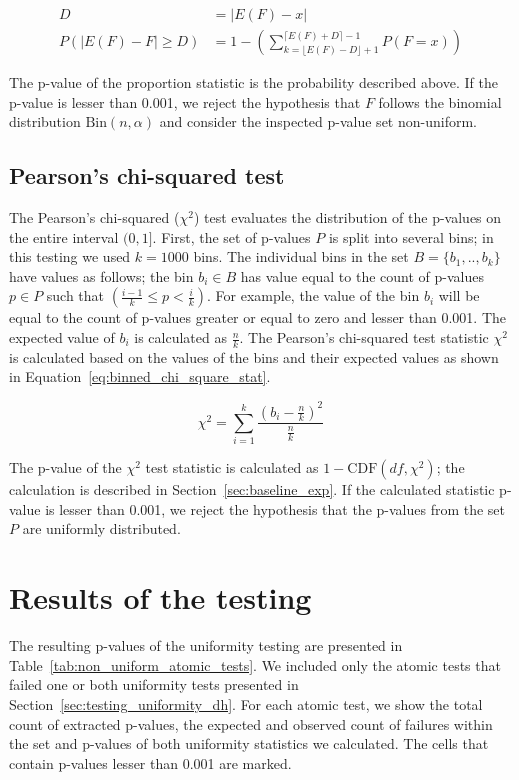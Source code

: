 \documentclass[
  digital,  	%
  color,		%
  oneside,   	%
  12pt,
  nocover,
  notable,
  nolof,
  nolot,
]{fithesis3}
\theoremstyle{definition}
\theoremstyle{remark}
\begin{document}
\begin{align}
D &= \lvert E(F) - x \rvert \\
\label{eq:prop_statistic}
P(\lvert E(F) - F \rvert \geq D) &= 1 - \left( \sum\limits_{k=\lfloor E(F)-D \rfloor + 1}^{\lceil E(F)+D \rceil - 1} P(F = x) \right)
\end{align}

The p-value of the proportion statistic is the probability described above. If the p-value is lesser than 0.001, we reject the hypothesis that $F$ follows the binomial distribution $\text{Bin}(n,\alpha)$ and consider the inspected p-value set non-uniform.


\subsection{Pearson's chi-squared test}
The Pearson's chi-squared ($\chi^2$) test evaluates the distribution of the p-values on the entire interval $(0,1]$. First, the set of p-values $P$ is split into several bins; in this testing we used $k=1000$ bins. The individual bins in the set $B = \{b_1,..,b_k\}$ have values as follows; the bin $b_i \in B$ has value equal to the count of p-values $p \in P$ such that $\left(\frac{i-1}{k} \leq p < \frac{i}{k}\right)$. For example, the value of the bin $b_i$ will be equal to the count of p-values greater or equal to zero and lesser than 0.001. The expected value of $b_i$ is calculated as $\frac{n}{k}$. The Pearson's chi-squared test statistic $\chi^2$ is calculated based on the values of the bins and their expected values as shown in Equation~\ref{eq:binned_chi_square_stat}.

\begin{equation}
\label{eq:binned_chi_square_stat}
\chi^2 = \sum\limits_{i=1}^{k} \frac{ \left( b_i - \frac{n}{k} \right)^{2} }{\frac{n}{k}}
\end{equation}

The p-value of the $\chi^2$ test statistic is calculated as $1-\text{CDF}(df, \chi^2)$; the calculation is described in Section~\ref{sec:baseline_exp}. If the calculated statistic p-value is lesser than 0.001, we reject the hypothesis that the p-values from the set $P$ are uniformly distributed.

\section{Results of the testing}
The resulting p-values of the uniformity testing are presented in Table~\ref{tab:non_uniform_atomic_tests}. We included only the atomic tests that failed one or both uniformity tests presented in Section~\ref{sec:testing_uniformity_dh}. For each atomic test, we show the total count of extracted p-values, the expected and observed count of failures within the set and p-values of both uniformity statistics we calculated. The cells that contain p-values lesser than 0.001 are marked.
\end{document}
